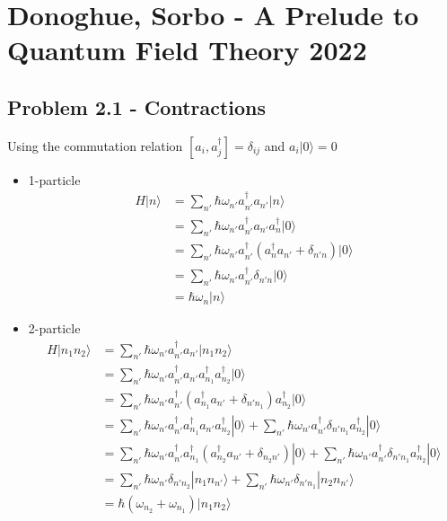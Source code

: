 \documentclass[../main.tex]{subfiles}
\begin{document}
\section{{\sc Donoghue, Sorbo} - A Prelude to Quantum Field Theory 2022}

\subsection{Problem 2.1 - Contractions}
Using the commutation relation $[a_i,a_j^\dagger]=\delta_{ij}$ and $a_i|0\rangle=0$
\begin{itemize}
\item 1-particle
\begin{align}
H|n\rangle
&=\sum_{n'}\hbar\omega_{n'}a_{n'}^\dagger a_{n'}|n\rangle\\
&=\sum_{n'}\hbar\omega_{n'}a_{n'}^\dagger a_{n'}a_{n}^\dagger|0\rangle\\
&=\sum_{n'}\hbar\omega_{n'}a_{n'}^\dagger (a_{n}^\dagger a_{n'}+\delta_{n'n})|0\rangle\\
&=\sum_{n'}\hbar\omega_{n'}a_{n'}^\dagger \delta_{n'n}|0\rangle\\
&=\hbar\omega_{n}|n\rangle
\end{align}

\item 2-particle
\begin{align}
H|n_1n_2\rangle
&=\sum_{n'}\hbar\omega_{n'}a_{n'}^\dagger a_{n'}|n_1n_2\rangle\\
&=\sum_{n'}\hbar\omega_{n'}a_{n'}^\dagger a_{n'}a_{n_1}^\dagger a_{n_2}^\dagger|0\rangle\\
&=\sum_{n'}\hbar\omega_{n'}a_{n'}^\dagger (a_{n_1}^\dagger a_{n'}+\delta_{n'n_1}) a_{n_2}^\dagger|0\rangle\\
&=\sum_{n'}\hbar\omega_{n'}a_{n'}^\dagger a_{n_1}^\dagger a_{n'}a_{n_2}^\dagger|0\rangle+
\sum_{n'}\hbar\omega_{n'}a_{n'}^\dagger\delta_{n'n_1} a_{n_2}^\dagger|0\rangle\\
&=\sum_{n'}\hbar\omega_{n'}a_{n'}^\dagger a_{n_1}^\dagger (a^\dagger_{n_2}a_{n'}+\delta_{n_2n'})|0\rangle+
\sum_{n'}\hbar\omega_{n'}a_{n'}^\dagger\delta_{n'n_1} a_{n_2}^\dagger|0\rangle\\
&=\sum_{n'}\hbar\omega_{n'}\delta_{n'n_2}|n_1n_{n'}\rangle+\sum_{n'}\hbar\omega_{n'}\delta_{n'n_1}|n_2n_{n'}\rangle\\
&=\hbar(\omega_{n_2}+\omega_{n_1})|n_1n_2\rangle\\
\end{align}
\end{itemize}
\end{document}
